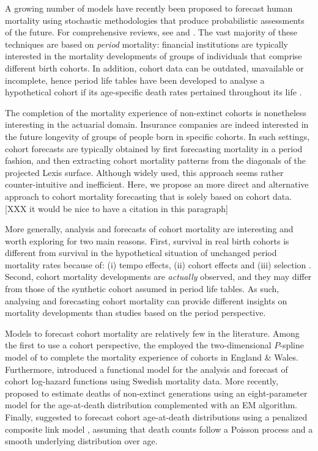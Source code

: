 \documentclass[11pt, a4paper]{article}
\begin{document}
A growing number of models have recently been proposed to forecast human mortality using stochastic methodologies that produce probabilistic assessments of the future. For comprehensive reviews, see \cite{booth2006demographic} and \cite{shang2011point}. The vast majority of these techniques are based on \textit{period} mortality: financial institutions are typically interested in the mortality developments of groups of individuals that comprise different birth cohorts. In addition, cohort data can be outdated, unavailable or incomplete, hence period life tables have been developed to analyse a hypothetical cohort if its age-specific death rates pertained throughout its life \citep{preston2001demogr}.
 
The completion of the mortality experience of non-extinct cohorts is nonetheless interesting in the actuarial domain. Insurance companies are indeed interested in the future longevity of groups of people born in specific cohorts. In such settings, cohort forecasts are typically obtained by first forecasting mortality in a period fashion, and then extracting cohort mortality patterns from the diagonals of the projected Lexis surface. Although widely used, this approach seems rather counter-intuitive and inefficient. Here, we propose an more direct and alternative approach to cohort mortality forecasting that is solely based on cohort data. [XXX it would be nice to have a citation in this paragraph]

More generally, analysis and forecasts of cohort mortality are interesting and worth exploring for two main reasons. First, survival in real birth cohorts is different from survival in the hypothetical situation of unchanged period mortality rates because of: (i) tempo effects, (ii) cohort effects and (iii) selection \cite[for a full discussion, see][Sect.~2]{borgan2018cohort}. Second, cohort mortality developments are \textit{actually} observed, and they may differ from those of the synthetic cohort assumed in period life tables. As such, analysing and forecasting cohort mortality can provide different insights on mortality developments than studies based on the period perspective.  

Models to forecast cohort mortality are relatively few in the literature. Among the first to use a cohort perspective, the \cite{cmi2007stochastic} employed the two-dimensional $P$-spline model of \cite{currie2004smoothing} to complete the mortality experience of cohorts in England \& Wales. Furthermore, \cite{chiou2009modeling} introduced a functional model for the analysis and forecast of cohort log-hazard functions using Swedish mortality data. More recently, \cite{zanotto2017reconstruction} proposed to estimate deaths of non-extinct generations using an eight-parameter model for the age-at-death distribution complemented with an EM algorithm. Finally, \cite{rizzi2019forecasting} suggested to forecast cohort age-at-death distributions using a penalized composite link model \citep{eilers2007ill}, assuming that death counts follow a Poisson process and a smooth underlying distribution over age. 
\end{document}
